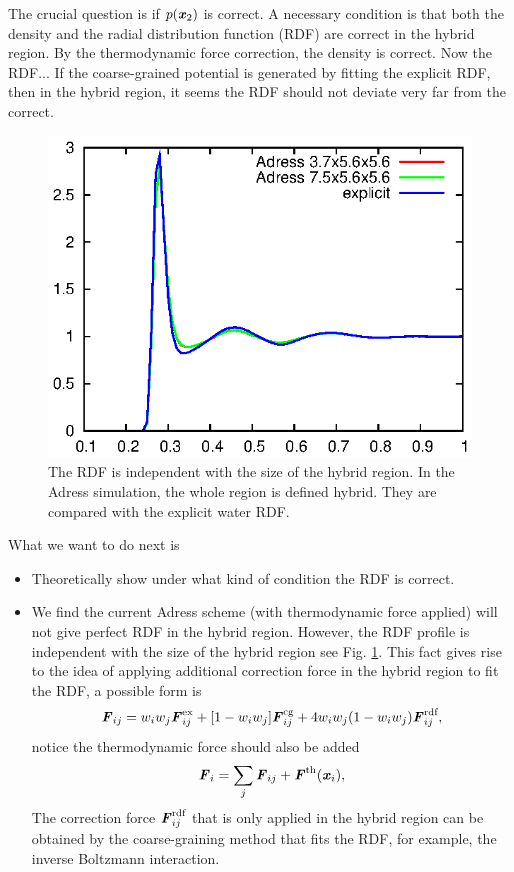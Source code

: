 \documentclass[aps,pre,preprint,unsortedaddress]{revtex4}
\newcommand{\redc}[1]{{\color{red} #1}}
\newcommand{\bluec}[1]{{\color{blue} #1}}
\renewcommand{\v}[1]{\textbf{\textit{#1}}}
\begin{document}
The crucial question is if $p(\v x_2)$ is correct.  A necessary
condition is that both the density and the radial distribution
function (RDF) are correct in the hybrid region. By the thermodynamic
force correction, the density is correct. Now the RDF...  If the
coarse-grained potential is generated by fitting the explicit RDF,
\redc{then in the hybrid region, it seems the RDF should not deviate very
  far from the correct.}

\begin{figure}
  \centering
  \includegraphics[]{fig/old.rdf/rdfs.eps}
  \caption{The RDF is independent with the size of the hybrid region.
    In the Adress simulation, the whole region is defined hybrid. They
    are compared with the explicit water RDF.}
  \label{fig:tmp2}
\end{figure}

\bluec{
  What we want to do next is
  \begin{itemize}
  \item Theoretically show under what kind of condition the RDF is
    correct.
  \item We find the current Adress scheme (with thermodynamic force
    applied) will not give perfect RDF in the hybrid region. However,
    the RDF profile is independent with the size of the hybrid region
    see Fig. \ref{fig:tmp2}. This fact gives rise to the idea of
    applying additional correction force in the hybrid region to fit
    the RDF, a possible form is
    \begin{align}
      \v F_{ij} = w_iw_j\v F^{\textrm{ex}}_{ij} + [1-w_iw_j]\v F^{\textrm{cg}}_{ij} +
      4 w_iw_j (1 - w_iw_j)\v F_{ij}^{\textrm{rdf}},
    \end{align}
    notice the thermodynamic force should also be added
    \begin{align}
      \v F_i = \sum_j\v F_{ij} + \v F^{\textrm{th}}(\v x_i),
    \end{align}
    The correction force $\v F_{ij}^{\textrm{rdf}}$ that is only
    applied in the hybrid region can be obtained by the
    coarse-graining method that fits the RDF, for example, the inverse
    Boltzmann interaction. 
  \end{itemize}
}
  
\end{document}
